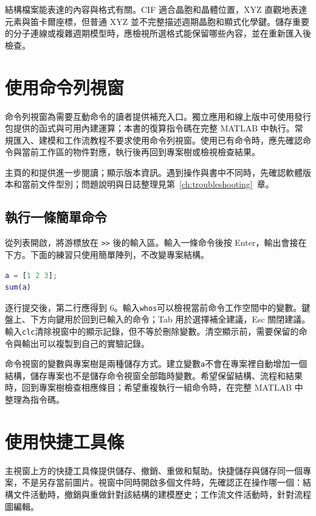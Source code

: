 結構檔案能表達的內容與格式有關。CIF 適合晶胞和晶體位置，XYZ 直觀地表達元素與笛卡爾座標，但普通 XYZ 並不完整描述週期晶胞和顯式化學鍵。儲存重要的分子連線或複雜週期模型時，應檢視所選格式能保留哪些內容，並在重新匯入後檢查。

\section{使用命令列視窗}
命令列視窗為需要互動命令的讀者提供補充入口。獨立應用和線上版中可使用發行包提供的函式與可用內建運算；本書的復算指令碼在完整 MATLAB\regmark{} 中執行。常規匯入、建模和工作流教程不要求使用命令列視窗。使用已有命令時，應先確認命令與當前工作區的物件對應，執行後再回到專案樹或檢視檢查結果。

主頁的和提供進一步閱讀；顯示版本資訊。遇到操作與書中不同時，先確認軟體版本和當前文件型別；問題說明與日誌整理見第~\ref{ch:troubleshooting}~章。

\subsection{執行一條簡單命令}

從列表開啟，將游標放在 \texttt{>>} 後的輸入區。輸入一條命令後按 Enter，輸出會接在下方。下面的練習只使用簡單陣列，不改變專案結構。

\begin{lstlisting}[language=Matlab]
a = [1 2 3];
sum(a)
\end{lstlisting}

逐行提交後，第二行應得到 6。輸入\texttt{whos}可以檢視當前命令工作空間中的變數。鍵盤上、下方向鍵用於回到已輸入的命令；Tab 用於選擇補全建議，Esc 關閉建議。輸入\texttt{clc}清除視窗中的顯示記錄，但不等於刪除變數。清空顯示前，需要保留的命令與輸出可以複製到自己的實驗記錄。

命令視窗的變數與專案樹是兩種儲存方式。建立變數\texttt{a}不會在專案裡自動增加一個結構，儲存專案也不是儲存命令視窗全部臨時變數。希望保留結構、流程和結果時，回到專案樹檢查相應條目；希望重複執行一組命令時，在完整 MATLAB\regmark{} 中整理為指令碼。

\section{使用快捷工具條}

主視窗上方的快捷工具條提供儲存、撤銷、重做和幫助。快捷儲存與儲存同一個專案，不是另存當前圖片。視窗中同時開啟多個文件時，先確認正在操作哪一個：結構文件活動時，撤銷與重做針對該結構的建模歷史；工作流文件活動時，針對流程圖編輯。

